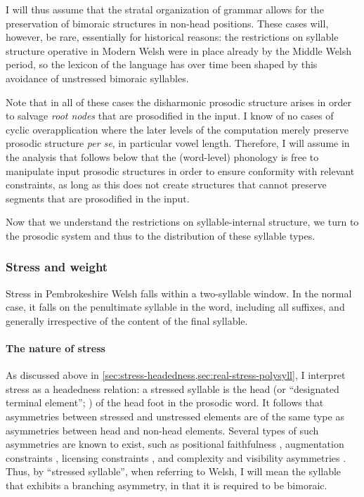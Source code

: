 I will thus assume that the stratal organization of grammar allows for the preservation of bimoraic structures in non\hyp head positions. These cases will, however, be rare, essentially for historical reasons: the restrictions on syllable structure operative in Modern Welsh were in place already by the Middle Welsh period, so the lexicon of the language has over time been shaped by this avoidance of unstressed bimoraic syllables.

Note that in all of these cases the disharmonic prosodic structure arises in order to salvage \emph{root nodes} that are prosodified in the input. I know of no cases of cyclic overapplication where the later levels of the computation merely preserve prosodic structure \emph{per se}, in particular vowel length. Therefore, I will assume in the analysis that follows below that the (word\hyp level) phonology is free to manipulate input prosodic structures in order to ensure conformity with relevant constraints, as long as this does not create structures that cannot preserve segments that are prosodified in the input.

Now that we understand the restrictions on syllable\hyp internal structure, we turn to the prosodic system and thus to the distribution of these syllable types.

\subsubsection{Stress and weight}
\label{sec:stress-weight}

Stress in Pembrokeshire Welsh falls within a two-syllable window. In the normal case, it falls on the penultimate syllable in the word, including all suffixes, and generally irrespective of the content of the final syllable.

\paragraph{The nature of stress}
\label{sec:nature-stress}

As discussed above in \cref{sec:stress-headedness,sec:real-stress-polysyll}, I interpret stress as a headedness relation: a stressed syllable is the head (or \enquote{designated terminal element}; \citealt{liberman77:_stres_linguis_rhyth,delacy2006}) of the head foot in the prosodic word. It follows that asymmetries between stressed and unstressed elements are of the same type as asymmetries between head and non-head elements. Several types of such asymmetries are known to exist, such as positional faithfulness \citep{beckman,alderete1999}, augmentation constraints \citep{smith-diss,smith04:_makin,teeple09:_bicon}, licensing constraints \citep{zoll1998,walker05:_weak_trigg_vowel_harmon,walker11:_vowel}, and complexity and visibility asymmetries \citep{weijer96:_segmen,dresher-vdhulst,rice07}. Thus, by \enquote{stressed syllable}, when referring to Welsh, I will mean the syllable that exhibits a branching asymmetry, in that it is required to be bimoraic.

